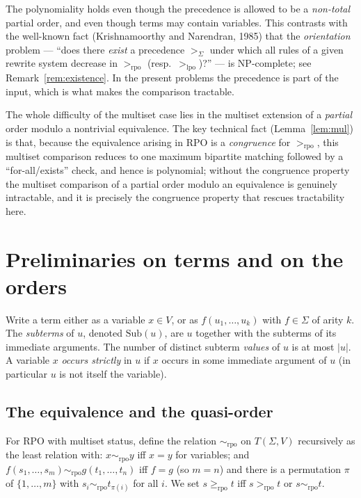 \documentclass{amsart}
\theoremstyle{definition}
\theoremstyle{remark}
\newcommand{\rpo}{>_{\mathrm{rpo}}}
\newcommand{\rpoe}{\ge_{\mathrm{rpo}}}
\newcommand{\lpo}{>_{\mathrm{lpo}}}
\newcommand{\sig}{\Sigma}
\newcommand{\prc}{>_{\sig}}
\newcommand{\T}{T(\sig,V)}
\newcommand{\size}[1]{|#1|}
\begin{document}
The polynomiality holds even though the precedence is allowed to be a
\emph{non-total} partial order, and even though terms may contain variables.
This contrasts with the well-known fact (Krishnamoorthy and Narendran, 1985)
that the \emph{orientation} problem --- ``does there \emph{exist} a precedence
$\prc$ under which all rules of a given rewrite system decrease in $\rpo$ (resp.\
$\lpo$)?'' --- is $\mathrm{NP}$-complete; see Remark~\ref{rem:existence}. In the
present problems the precedence is part of the input, which is what makes the
comparison tractable.

The whole difficulty of the multiset case lies in the multiset extension of a
\emph{partial} order modulo a nontrivial equivalence. The key technical fact
(Lemma~\ref{lem:mul}) is that, because the equivalence arising in RPO is a
\emph{congruence} for $\rpo$, this multiset comparison reduces to one maximum
bipartite matching followed by a ``for-all/exists'' check, and hence is
polynomial; without the congruence property the multiset comparison of a partial
order modulo an equivalence is genuinely intractable, and it is precisely the
congruence property that rescues tractability here.

\section{Preliminaries on terms and on the orders}\label{sec:equiv}

Write a term either as a variable $x\in V$, or as $f(u_1,\dots,u_k)$ with
$f\in\sig$ of arity $k$. The \emph{subterms} of $u$, denoted $\mathrm{Sub}(u)$,
are $u$ together with the subterms of its immediate arguments. The number of
distinct subterm \emph{values} of $u$ is at most $\size{u}$. A variable $x$
\emph{occurs strictly} in $u$ if $x$ occurs in some immediate argument of $u$ (in
particular $u$ is not itself the variable).

\subsection{The equivalence and the quasi-order}
For RPO with multiset status, define the relation $\sim_{\mathrm{rpo}}$ on $\T$
recursively as the least relation with: $x\sim_{\mathrm{rpo}}y$ iff $x=y$ for
variables; and $f(s_1,\dots,s_m)\sim_{\mathrm{rpo}}g(t_1,\dots,t_n)$ iff $f=g$
(so $m=n$) and there is a permutation $\pi$ of $\{1,\dots,m\}$ with
$s_i\sim_{\mathrm{rpo}}t_{\pi(i)}$ for all $i$. We set
$s\rpoe t$ iff $s\rpo t$ or $s\sim_{\mathrm{rpo}}t$.
\end{document}
